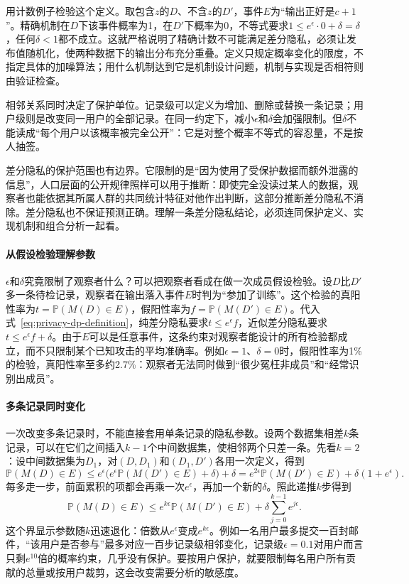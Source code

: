 用计数例子检验这个定义。取包含$z$的$D$、不含$z$的$D'$，事件$E$为“输出正好是$c+1$”。精确机制在$D$下该事件概率为1，在$D'$下概率为0，不等式要求$1\leq e^\epsilon\cdot0+\delta=\delta$，任何$\delta<1$都不成立。这就严格说明了精确计数不可能满足差分隐私，必须让发布值随机化，使两种数据下的输出分布充分重叠。定义只规定概率变化的限度，不指定具体的加噪算法；用什么机制达到它是机制设计问题，机制与实现是否相符则由验证检查。

相邻关系同时决定了保护单位。记录级可以定义为增加、删除或替换一条记录；用户级则是改变同一用户的全部记录。在同一约定下，减小$\epsilon$和$\delta$会加强限制。但$\delta$不能读成“每个用户以该概率被完全公开”：它是对整个概率不等式的容忍量，不是按人抽签。

差分隐私的保护范围也有边界。它限制的是“因为使用了受保护数据而额外泄露的信息”，人口层面的公开规律照样可以用于推断：即使完全没读过某人的数据，观察者也能依据其所属人群的共同统计特征对他作出判断，这部分推断差分隐私不消除。差分隐私也不保证预测正确。理解一条差分隐私结论，必须连同保护定义、实现机制和组合分析一起看。

\paragraph{从假设检验理解参数}

$\epsilon$和$\delta$究竟限制了观察者什么？可以把观察者看成在做一次成员假设检验。设$D$比$D'$多一条待检记录，观察者在输出落入事件$E$时判为“参加了训练”。这个检验的真阳性率为$t=\mathbb P(M(D)\in E)$，假阳性率为$f=\mathbb P(M(D')\in E)$。代入式~\eqref{eq:privacy-dp-definition}，纯差分隐私要求$t\leq e^\epsilon f$，近似差分隐私要求$t\leq e^\epsilon f+\delta$。由于$E$可以是任意事件，这条约束对观察者能设计的所有检验都成立，而不只限制某个已知攻击的平均准确率。例如$\epsilon=1$、$\delta=0$时，假阳性率为1\%的检验，真阳性率至多约2.7\%：观察者无法同时做到“很少冤枉非成员”和“经常识别出成员”。

\paragraph{多条记录同时变化}

一次改变多条记录时，不能直接套用单条记录的隐私参数。设两个数据集相差$k$条记录，可以在它们之间插入$k-1$个中间数据集，使相邻两个只差一条。先看$k=2$：设中间数据集为$D_1$，对$(D,D_1)$和$(D_1,D')$各用一次定义，得到
\[
 \mathbb P(M(D)\in E)\leq e^\epsilon\bigl(e^\epsilon\mathbb P(M(D')\in E)+\delta\bigr)+\delta
 =e^{2\epsilon}\mathbb P(M(D')\in E)+\delta(1+e^{\epsilon}).
\]
每多走一步，前面累积的项都会再乘一次$e^\epsilon$，再加一个新的$\delta$。照此递推$k$步得到
\begin{equation}
 \mathbb P(M(D)\in E)
 \leq e^{k\epsilon}\mathbb P(M(D')\in E)
   +\delta\sum_{j=0}^{k-1}e^{j\epsilon}.
 \label{eq:privacy-group-bound}
\end{equation}
这个界显示参数随$k$迅速退化：倍数从$e^\epsilon$变成$e^{k\epsilon}$。例如一名用户最多提交一百封邮件，“该用户是否参与”最多对应一百步记录级相邻变化，记录级$\epsilon=0.1$对用户而言只剩$e^{10}$倍的概率约束，几乎没有保护。要按用户保护，就要限制每名用户所有贡献的总量或按用户裁剪，这会改变需要分析的敏感度。


